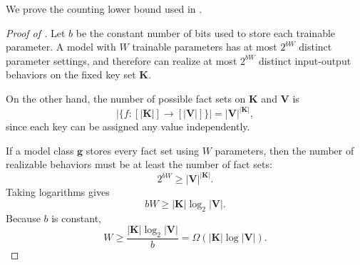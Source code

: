 We prove the counting lower bound used in
.

\begin{proof}[Proof of ]
Let $b$ be the constant number of bits used to store each trainable parameter.
A model with $W$ trainable parameters has at most $2^{bW}$ distinct parameter
settings, and therefore can realize at most $2^{bW}$ distinct input-output
behaviors on the fixed key set $\mathbf{K}$.

On the other hand, the number of possible fact sets on $\mathbf{K}$ and
$\mathbf{V}$ is
\[
    \left|\{f : [|\mathbf{K}|] \to [|\mathbf{V}|]\}\right|
    =
    |\mathbf{V}|^{|\mathbf{K}|},
\]
since each key can be assigned any value independently.

If a model class $\mathbf{g}$ stores every fact set using $W$ parameters, then
the number of realizable behaviors must be at least the number of fact sets:
\[
    2^{bW}
    \ge
    |\mathbf{V}|^{|\mathbf{K}|}.
\]
Taking logarithms gives
\[
    bW
    \ge
    |\mathbf{K}|\log_{2}|\mathbf{V}|.
\]
Because $b$ is constant,
\[
    W
    \ge
    \frac{|\mathbf{K}|\log_{2}|\mathbf{V}|}{b}
    =
    \Omega\!\left(|\mathbf{K}|\log |\mathbf{V}|\right).
\]
\end{proof}

